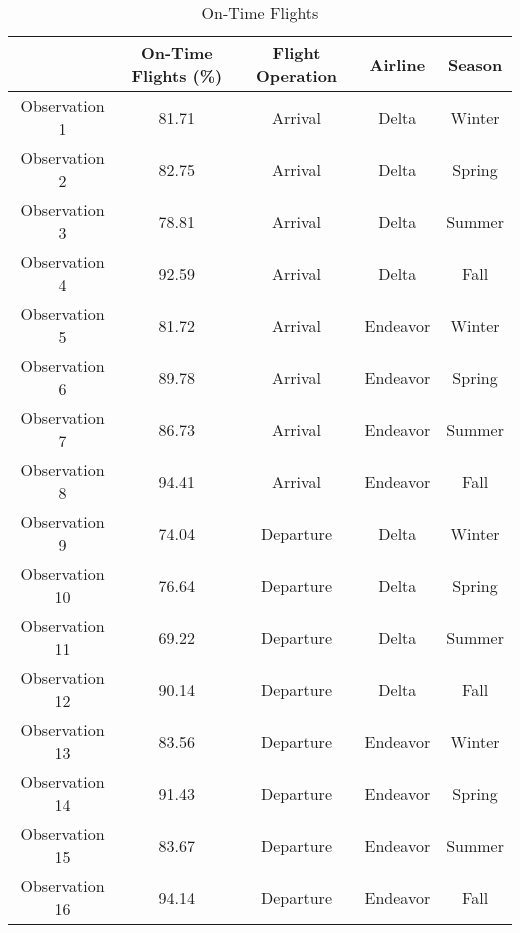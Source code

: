 \documentclass{article}
\begin{document}
  \begin{table}[H]
    \centering

    \begin{tabular}{ c | c c c c }
      \toprule
                      & On-Time Flights (\%)  & Flight Operation  & Airline   & Season    \\
      \midrule
      Observation 1   & 81.71                 & Arrival           & Delta     & Winter    \\
      \midrule
      Observation 2   & 82.75                 & Arrival           & Delta     & Spring    \\
      \midrule
      Observation 3   & 78.81                 & Arrival           & Delta     & Summer    \\
      \midrule
      Observation 4   & 92.59                 & Arrival           & Delta     & Fall      \\
      \midrule
      Observation 5   & 81.72                 & Arrival           & Endeavor  & Winter    \\
      \midrule
      Observation 6   & 89.78                 & Arrival           & Endeavor  & Spring    \\
      \midrule
      Observation 7   & 86.73                 & Arrival           & Endeavor  & Summer    \\
      \midrule
      Observation 8   & 94.41                 & Arrival           & Endeavor  & Fall      \\
      \midrule
      Observation 9   & 74.04                 & Departure         & Delta     & Winter    \\
      \midrule
      Observation 10  & 76.64                 & Departure         & Delta     & Spring    \\
      \midrule
      Observation 11  & 69.22                 & Departure         & Delta     & Summer    \\
      \midrule
      Observation 12  & 90.14                 & Departure         & Delta     & Fall      \\
      \midrule
      Observation 13  & 83.56                 & Departure         & Endeavor  & Winter    \\
      \midrule
      Observation 14  & 91.43                 & Departure         & Endeavor  & Spring    \\
      \midrule
      Observation 15  & 83.67                 & Departure         & Endeavor  & Summer    \\
      \midrule
      Observation 16  & 94.14                 & Departure         & Endeavor  & Fall      \\
      \bottomrule
    \end{tabular}
    \caption{On-Time Flights}
    \label{tab:exectime}
  \end{table}
\end{document}
